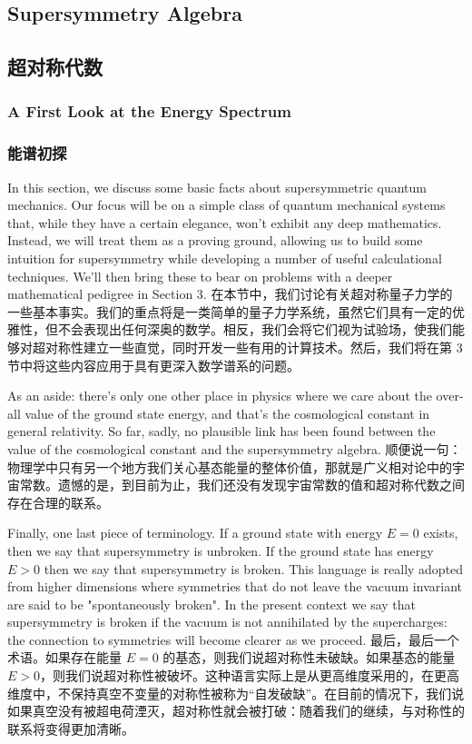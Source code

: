 \documentclass{article}
\begin{document}
\begin{paracol}{2}
\subsection{Supersymmetry Algebra}
\switchcolumn
\subsection*{超对称代数}
\switchcolumn*

\subsubsection{A First Look at the Energy Spectrum}
\switchcolumn
\subsubsection*{能谱初探}
\switchcolumn*

In this section, we discuss some basic facts about supersymmetric quantum mechanics. Our focus will be on a simple class of quantum mechanical systems that, while they have a certain elegance, won't exhibit any deep mathematics. Instead, we will treat them as a proving ground, allowing us to build some intuition for supersymmetry while developing a number of useful calculational techniques. We'll then bring these to bear on problems with a deeper mathematical pedigree in Section 3.
\switchcolumn
在本节中，我们讨论有关超对称量子力学的一些基本事实。我们的重点将是一类简单的量子力学系统，虽然它们具有一定的优雅性，但不会表现出任何深奥的数学。相反，我们会将它们视为试验场，使我们能够对超对称性建立一些直觉，同时开发一些有用的计算技术。然后，我们将在第 3 节中将这些内容应用于具有更深入数学谱系的问题。
\switchcolumn*

As an aside: there's only one other place in physics where we care about the over- all value of the ground state energy, and that's the cosmological constant in general relativity. So far, sadly, no plausible link has been found between the value of the cosmological constant and the supersymmetry algebra.
\switchcolumn
顺便说一句：物理学中只有另一个地方我们关心基态能量的整体价值，那就是广义相对论中的宇宙常数。遗憾的是，到目前为止，我们还没有发现宇宙常数的值和超对称代数之间存在合理的联系。
\switchcolumn*

Finally, one last piece of terminology. If a ground state with energy $E = 0$ exists, then we say that supersymmetry is unbroken. If the ground state has energy $E > 0$ then we say that supersymmetry is broken. This language is really adopted from higher dimensions where symmetries that do not leave the vacuum invariant are said to be "spontaneously broken". In the present context we say that supersymmetry is broken if the vacuum is not annihilated by the supercharges: the connection to symmetries will become clearer as we proceed.
\switchcolumn
最后，最后一个术语。如果存在能量 $E = 0$ 的基态，则我们说超对称性未破缺。如果基态的能量 $E > 0$，则我们说超对称性被破坏。这种语言实际上是从更高维度采用的，在更高维度中，不保持真空不变量的对称性被称为“自发破缺”。在目前的情况下，我们说如果真空没有被超电荷湮灭，超对称性就会被打破：随着我们的继续，与对称性的联系将变得更加清晰。
\switchcolumn*


\end{paracol}
\end{document}
